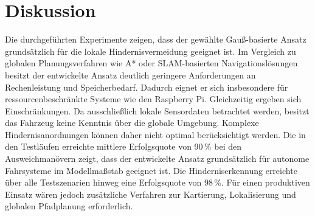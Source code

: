 \section{Diskussion}
Die durchgeführten Experimente zeigen, dass der gewählte Gauß-basierte Ansatz grundsätzlich für die lokale Hindernisvermeidung geeignet ist. Im Vergleich zu globalen Planungsverfahren wie A* oder SLAM-basierten Navigationslösungen besitzt der entwickelte Ansatz deutlich geringere Anforderungen an Rechenleistung und Speicherbedarf. Dadurch eignet er sich insbesondere für ressourcenbeschränkte Systeme wie den Raspberry Pi. Gleichzeitig ergeben sich Einschränkungen. Da ausschließlich lokale Sensordaten betrachtet werden, besitzt das Fahrzeug keine Kenntnis über die globale Umgebung. Komplexe Hindernisanordnungen können daher nicht optimal berücksichtigt werden. Die in den Testläufen erreichte mittlere Erfolgsquote von 90\,\% bei den Ausweichmanövern zeigt, dass der entwickelte Ansatz grundsätzlich für autonome Fahrsysteme im Modellmaßstab geeignet ist. Die Hinderniserkennung erreichte über alle Testszenarien hinweg eine Erfolgsquote von 98\,\%. Für einen produktiven Einsatz wären jedoch zusätzliche Verfahren zur Kartierung, Lokalisierung und globalen Pfadplanung erforderlich.